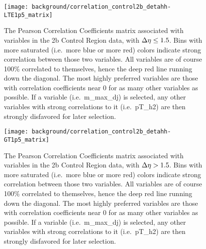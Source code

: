     \begin{figure}[tbh]
        \texttt{[image: background/correlation\_control2b\_detahh-LTE1p5\_matrix]}
        \caption{
            The Pearson Correlation Coefficients matrix associated with variables in the 2b Control Region data,
                with $\Delta \eta \leq 1.5$.
            Bins with more saturated (i.e.\ more blue or more red) colors indicate strong correlation between those two variables.
            All variables are of course 100\% correlated to themselves, hence the deep red line running down the diagonal.
            The most highly preferred variables are those with correlation coefficients near 0 for as many other variables as possible.
            If a variable (i.e.\ m\_max\_dj) is selected, any other variables with strong correlations to it (i.e.\ pT\_h2)
                are then strongly disfavored for later selection.
        }
        \label{fig:vbf_corr_matrix_LT1.5}
    \end{figure}

    \begin{figure}[tbh]
        \texttt{[image: background/correlation\_control2b\_detahh-GT1p5\_matrix]}
        \caption{
            The Pearson Correlation Coefficients matrix associated with variables in the 2b Control Region data,
                with $\Delta \eta > 1.5$.
            Bins with more saturated (i.e.\ more blue or more red) colors indicate strong correlation between those two variables.
            All variables are of course 100\% correlated to themselves, hence the deep red line running down the diagonal.
            The most highly preferred variables are those with correlation coefficients near 0 for as many other variables as possible.
            If a variable (i.e.\ m\_max\_dj) is selected, any other variables with strong correlations to it (i.e.\ pT\_h2)
                are then strongly disfavored for later selection.
        }
        \label{fig:vbf_corr_matrix_GT1.5}
    \end{figure}


